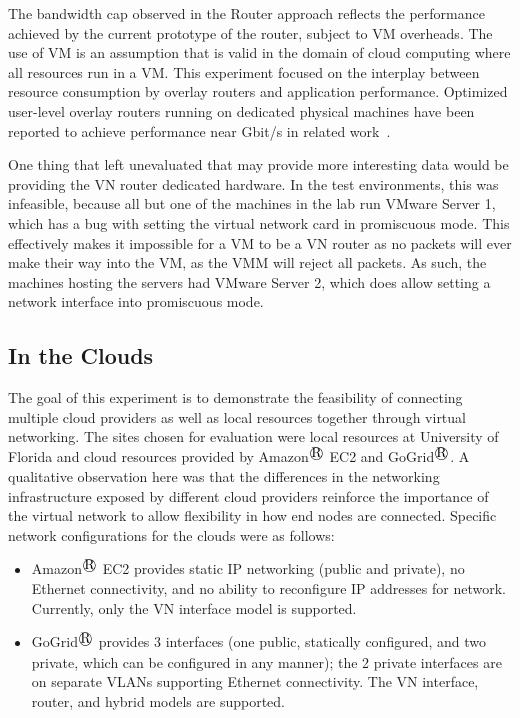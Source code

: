 The bandwidth cap observed in the Router approach reflects the performance
achieved by the current prototype of the router, subject to VM overheads. The
use of VM is an assumption that is valid in the domain of cloud computing where
all resources run in a VM. This experiment focused on the interplay between
resource consumption by overlay routers and application performance.  Optimized
user-level overlay routers running on dedicated physical machines have been
reported to achieve performance near Gbit/s in related work~\cite{vine2}.

One thing that left unevaluated that may provide more interesting data would be
providing the VN router dedicated hardware.  In the test environments, this was
infeasible, because all but one of the machines in the lab run VMware Server 1,
which has a bug with setting the virtual network card in promiscuous mode.
This effectively makes it impossible for a VM to be a VN router as no packets
will ever make their way into the VM, as the VMM will reject all packets.  As
such, the machines hosting the servers had VMware Server 2, which does allow
setting a network interface into promiscuous mode.

\subsection{In the Clouds}

The goal of this experiment is to demonstrate the feasibility of connecting
multiple cloud providers as well as local resources together through virtual
networking.  The sites chosen for evaluation were local resources at University
of Florida and cloud resources provided by Amazon$^\registered$ EC2 and GoGrid$^\registered$.  A
qualitative observation here was that the differences in the networking
infrastructure exposed by different cloud providers reinforce the importance of
the virtual network to allow flexibility in how end nodes are connected.
Specific network configurations for the clouds were as follows:

\begin{itemize}

\item Amazon$^\registered$ EC2 provides static IP networking (public and private), no
Ethernet connectivity, and no ability to reconfigure IP addresses for network.
Currently, only the VN interface model is supported.

\item GoGrid$^\registered$ provides 3 interfaces (one public, statically configured, and two
private, which can be configured in any manner); the 2 private interfaces are
on separate VLANs supporting Ethernet connectivity. The VN interface, router,
and hybrid models are supported.

\end{itemize}

